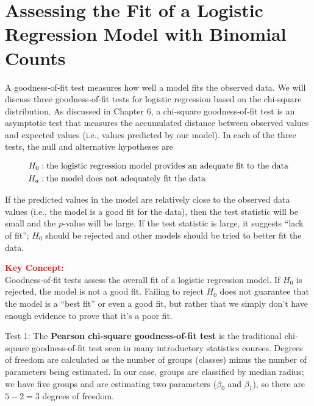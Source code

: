 \documentclass[
]{report}
\begin{document}
\section{\texorpdfstring{\textbf{Assessing the Fit of a Logistic Regression Model with Binomial Counts}}{Assessing the Fit of a Logistic Regression Model with Binomial Counts}}\label{assessing-the-fit-of-a-logistic-regression-model-with-binomial-counts}

A goodness‐of‐fit test measures how well a model fits the observed data. We will discuss three goodness‐of‐fit tests for logistic regression based on the chi‐square distribution. As discussed in Chapter 6, a chi‐square goodness‐of‐fit test is an asymptotic test that measures the accumulated distance between observed values and expected values (i.e., values predicted by our model). In each of the three tests, the null and alternative hypotheses are

\begin{align}
H_0:\;&\text{the logistic regression model provides an adequate fit to the data} \notag \\
H_a:\;&\text{the model does not adequately fit the data} \notag
\end{align}

If the predicted values in the model are relatively close to the observed data values (i.e., the model is a good fit for the data), then the test statistic will be small and the \(p\)-value will be large. If the test statistic is large, it suggests ``lack of fit''; \(H_0\) should be rejected and other models should be tried to better fit the data.

\large

\textbf{\textcolor{red}{Key Concept:}}\\
\color{red}
Goodness‐of‐fit tests assess the overall fit of a logistic regression model. If \(H_0\) is rejected, the model is not a good fit. Failing to reject \(H_0\) does not guarantee that the model is a ``best fit'' or even a good fit, but rather that we simply don't have enough evidence to prove that it's a poor fit.\\
\color{black}
\normalsize

Test 1: The \textbf{Pearson chi‐square goodness‐of‐fit test} is the traditional chi‐square goodness‐of‐fit test seen in many introductory statistics courses. Degrees of freedom are calculated as the number of groups (classes) minus the number of parameters being estimated. In our case, groups are classified by median radius; we have five groups and are estimating two parameters (\(\beta_0\) and \(\beta_1\)), so there are \(5 - 2 = 3\) degrees of freedom.
\end{document}
